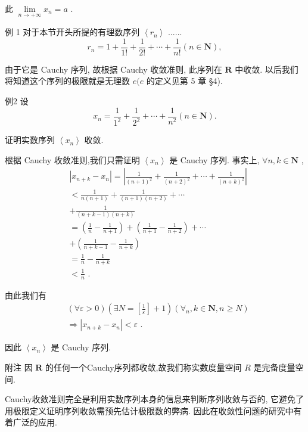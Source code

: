 此 $\mathop{\lim }\limits_{{n \rightarrow   + \infty }}{x}_{n} = a$ .

例 1 对于本节开头所提的有理数序列 $\left\langle  {r}_{n}\right\rangle$ ......
$${r}_{n} = 1 + \frac{1}{1!} + \frac{1}{2!} + \cdots  + \frac{1}{n!}\left( {n \in  \mathbf{N}}\right) ,$$

由于它是 Cauchy 序列, 故根据 Cauchy 收敛准则, 此序列在 $\mathbf{R}$ 中收敛. 以后我们将知道这个序列的极限就是无理数 $e(e$ 的定义见第 5 章 §4).

例2 设
$${x}_{n} = \frac{1}{{1}^{2}} + \frac{1}{{2}^{2}} + \cdots  + \frac{1}{{n}^{2}}\left( {n \in  \mathbf{N}}\right) .$$

证明实数序列 $\left\langle  {x}_{n}\right\rangle$ 收敛.

根据 Cauchy 收敛准则,我们只需证明 $\left\langle  {x}_{n}\right\rangle$ 是 Cauchy 序列. 事实上, $\forall n,k \in  \mathbf{N}$ ,
\begin{align*}
	&\left| {{x}_{n + k} - {x}_{n}}\right|  = \left| {\frac{1}{{\left( n + 1\right) }^{2}} + \frac{1}{{\left( n + 2\right) }^{2}} + \cdots  + \frac{1}{{\left( n + k\right) }^{2}}}\right|\\
	&< \frac{1}{n\left( {n + 1}\right) } + \frac{1}{\left( {n + 1}\right) \left( {n + 2}\right) } + \cdots\\
	&+ \frac{1}{\left( {n + k - 1}\right) \left( {n + k}\right) }\\
	&= \left( {\frac{1}{n} - \frac{1}{n + 1}}\right)  + \left( {\frac{1}{n + 1} - \frac{1}{n + 2}}\right)  + \cdots\\
	&+ \left( {\frac{1}{n + k - 1} - \frac{1}{n + k}}\right)\\
	&= \frac{1}{n} - \frac{1}{n + k}\\
	&< \frac{1}{n}\text{ . }
\end{align*}

由此我们有
\begin{align*}
	&\left( {\forall \varepsilon  > 0}\right) \left( {\exists N = \left\lbrack  \frac{1}{\varepsilon }\right\rbrack   + 1}\right) \left( {{\forall }_{n},k \in  \mathbf{N},n \geq  N}\right)\\
	&\Rightarrow  \left| {{x}_{n + k} - {x}_{n}}\right|  < \varepsilon \text{ . }
\end{align*}

因此 $\left\langle  {x}_{n}\right\rangle$ 是 Cauchy 序列.

附注 因 $\mathbf{R}$ 的任何一个Cauchy序列都收敛,故我们称实数度量空间 $R$ 是完备度量空间.

Cauchy收敛准则完全是利用实数序列本身的信息来判断序列收敛与否的, 它避免了用极限定义证明序列收敛需预先估计极限数的弊病. 因此在收敛性问题的研究中有着广泛的应用.

